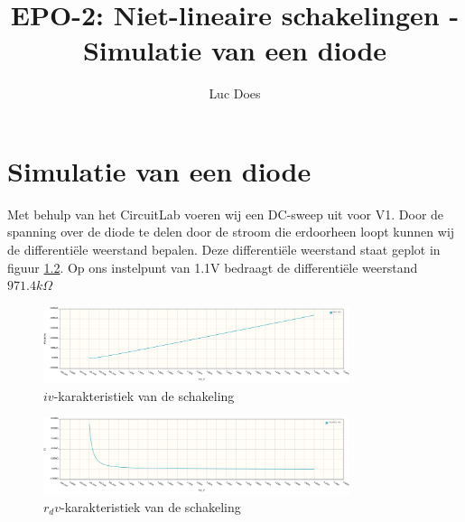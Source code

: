 \documentclass{report}
\title{EPO-2: Niet-lineaire schakelingen - Simulatie van een diode}
\author{Luc Does}
\begin{document}
\chapter{Simulatie van een diode}
\label{ch: Simulatie van een diode}

Met behulp van het CircuitLab voeren wij een DC-sweep uit voor V1. Door de spanning over de diode te delen door de stroom die erdoorheen loopt kunnen wij de differentiële weerstand bepalen. Deze differentiële weerstand staat geplot in figuur \ref{fig:rdv}. Op ons instelpunt van 1.1V bedraagt de differentiële weerstand $971.4k\Omega$
\begin{figure}[H] 
	\centering
	\includegraphics[width=0.8\textwidth]{iv.png}
	\caption{$iv$-karakteristiek van de schakeling}
	\label{fig:iv}
\end{figure}

\begin{figure}[H]
	\centering
	\includegraphics[width=0.8\textwidth]{RdV.png}
	\caption{$r_dv$-karakteristiek van de schakeling}
	\label{fig:rdv}
\end{figure}
\end{document}
